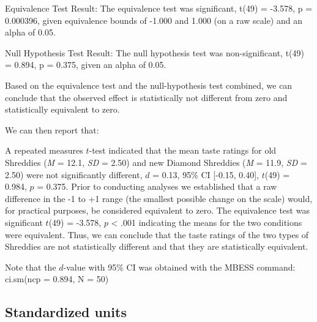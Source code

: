 \documentclass[
]{krantz}
\makeatletter
\newenvironment{Shaded}{\begin{snugshade}}{\end{snugshade}}
\newcommand{\DecValTok}[1]{\textcolor[rgb]{0.06,0.06,0.06}{#1}}
\newcommand{\FloatTok}[1]{\textcolor[rgb]{0.06,0.06,0.06}{#1}}
\newcommand{\FunctionTok}[1]{\textcolor[rgb]{0,0,0}{#1}}
\newcommand{\NormalTok}[1]{#1}
\newcommand{\OtherTok}[1]{\textcolor[rgb]{0.37,0.37,0.37}{#1}}
\newcommand{\SpecialCharTok}[1]{\textcolor[rgb]{0,0,0}{#1}}
\newenvironment{kframe}{%
\medskip{}
\setlength{\fboxsep}{.8em}
 \def\at@end@of@kframe{}%
 \ifinner\ifhmode%
  \def\at@end@of@kframe{\end{minipage}}%
  \begin{minipage}{\columnwidth}%
 \fi\fi%
 \def\FrameCommand##1{\hskip\@totalleftmargin \hskip-\fboxsep
 \colorbox{shadecolor}{##1}\hskip-\fboxsep
     \hskip-\linewidth \hskip-\@totalleftmargin \hskip\columnwidth}%
 \MakeFramed {\advance\hsize-\width
   \@totalleftmargin\z@ \linewidth\hsize
   \@setminipage}}%
 {\par\unskip\endMakeFramed%
 \at@end@of@kframe}
\renewenvironment{Shaded}{\begin{kframe}}{\end{kframe}}
\makeatother
\begin{document}
\begin{Shaded}
\begin{Highlighting}[]
\NormalTok{Equivalence Test Result}\SpecialCharTok{:}
\NormalTok{The equivalence test was significant, }\FunctionTok{t}\NormalTok{(}\DecValTok{49}\NormalTok{) }\OtherTok{=} \SpecialCharTok{{-}}\FloatTok{3.578}\NormalTok{, p }\OtherTok{=} \FloatTok{0.000396}\NormalTok{, }
\NormalTok{given equivalence bounds of }\SpecialCharTok{{-}}\FloatTok{1.000}\NormalTok{ and }\FloatTok{1.000}\NormalTok{ (on a raw scale) and an alpha of }\DecValTok{0}\NormalTok{.}\FloatTok{05.}

\NormalTok{Null Hypothesis Test Result}\SpecialCharTok{:}
\NormalTok{The null hypothesis test was non}\SpecialCharTok{{-}}\NormalTok{significant, }
\FunctionTok{t}\NormalTok{(}\DecValTok{49}\NormalTok{) }\OtherTok{=} \FloatTok{0.894}\NormalTok{, p }\OtherTok{=} \FloatTok{0.375}\NormalTok{, given an alpha of }\DecValTok{0}\NormalTok{.}\FloatTok{05.}

\NormalTok{Based on the equivalence test and the null}\SpecialCharTok{{-}}\NormalTok{hypothesis test combined, }
\NormalTok{we can conclude that the observed effect is statistically not different}
\NormalTok{from zero and statistically equivalent to zero.}
\end{Highlighting}
\end{Shaded}

We can then report that:

A repeated measures \(t\)-test indicated that the mean taste ratings for old Shreddies (\emph{M} = 12.1, \emph{SD} = 2.50) and new Diamond Shreddies (\emph{M} = 11.9, \emph{SD} = 2.50) were not significantly different, \(d\) = 0.13, 95\% CI {[}-0.15, 0.40{]}, \(t\)(49) = 0.984, \(p\) = 0.375. Prior to conducting analyses we established that a raw difference in the -1 to +1 range (the smallest possible change on the scale) would, for practical purposes, be considered equivalent to zero. The equivalence test was significant \(t\)(49) = -3.578, \(p\) \textless{} .001 indicating the means for the two conditions were equivalent. Thus, we can conclude that the taste ratings of the two types of Shreddies are not statistically different and that they are statistically equivalent.

Note that the \(d\)-value with 95\% CI was obtained with the MBESS command: ci.sm(ncp = 0.894, N = 50)

\hypertarget{standardized-units-1}{%
\subsection{Standardized units}\label{standardized-units-1}}
\end{document}
